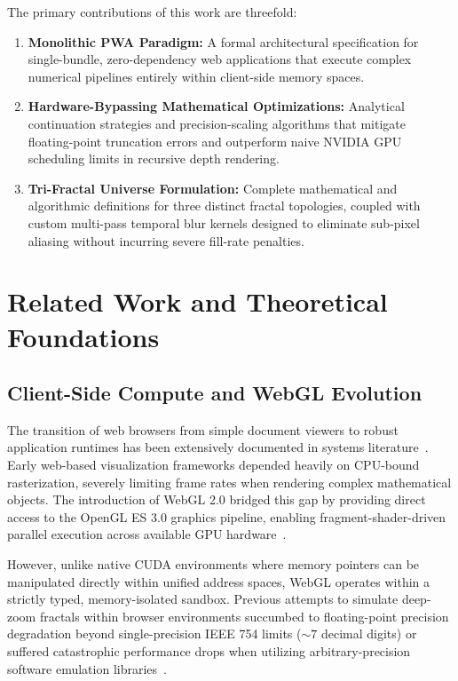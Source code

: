 \documentclass[10pt,journal,compsoc]{IEEEtran}
\begin{document}
The primary contributions of this work are threefold:
\begin{enumerate}
    \item \textbf{Monolithic PWA Paradigm:} A formal architectural specification for single-bundle, zero-dependency web applications that execute complex numerical pipelines entirely within client-side memory spaces.
    \item \textbf{Hardware-Bypassing Mathematical Optimizations:} Analytical continuation strategies and precision-scaling algorithms that mitigate floating-point truncation errors and outperform naive NVIDIA GPU scheduling limits in recursive depth rendering.
    \item \textbf{Tri-Fractal Universe Formulation:} Complete mathematical and algorithmic definitions for three distinct fractal topologies, coupled with custom multi-pass temporal blur kernels designed to eliminate sub-pixel aliasing without incurring severe fill-rate penalties.
\end{enumerate}

\section{Related Work and Theoretical Foundations}
\subsection{Client-Side Compute and WebGL Evolution}
The transition of web browsers from simple document viewers to robust application runtimes has been extensively documented in systems literature~\cite{dailey2007progressive}. Early web-based visualization frameworks depended heavily on CPU-bound rasterization, severely limiting frame rates when rendering complex mathematical objects. The introduction of WebGL 2.0 bridged this gap by providing direct access to the OpenGL ES 3.0 graphics pipeline, enabling fragment-shader-driven parallel execution across available GPU hardware~\cite{khronoswebgl2}. 

However, unlike native CUDA environments where memory pointers can be manipulated directly within unified address spaces, WebGL operates within a strictly typed, memory-isolated sandbox. Previous attempts to simulate deep-zoom fractals within browser environments succumbed to floating-point precision degradation beyond single-precision IEEE 754 limits ($\sim 7$ decimal digits) or suffered catastrophic performance drops when utilizing arbitrary-precision software emulation libraries~\cite{mandelbrot1982fractal, peitgen1986beauty, quilezfractal}.
\end{document}
